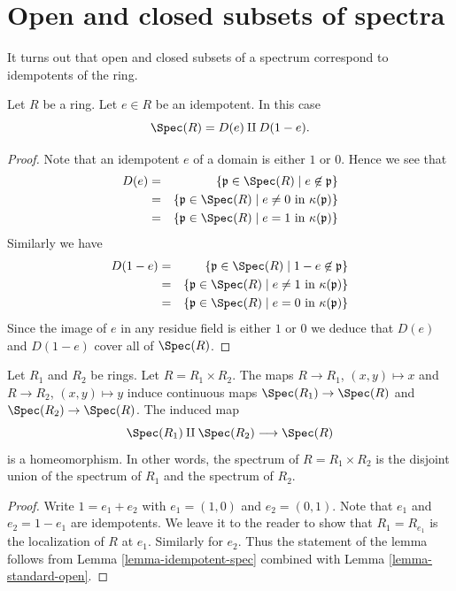 \section{Open and closed subsets of spectra}
\label{section-open-and-closed}

\noindent
It turns out that open and closed subsets of a spectrum correspond to
idempotents of the ring.

\begin{lemma}
\label{lemma-idempotent-spec}
Let $R$ be a ring. Let $e \in R$ be an idempotent.
In this case
$$
\Spec(R) = D(e) \amalg D(1-e).
$$
\end{lemma}

\begin{proof}
Note that an idempotent $e$ of a domain is either $1$ or $0$.
Hence we see that
\begin{eqnarray*}
D(e)
& = &
\{ \mathfrak p \in \Spec(R)
\mid
e \not\in \mathfrak p \} \\
& = &
\{ \mathfrak p \in \Spec(R)
\mid
e \not = 0\text{ in }\kappa(\mathfrak p) \} \\
& = &
\{ \mathfrak p \in \Spec(R)
\mid
e = 1\text{ in }\kappa(\mathfrak p) \}
\end{eqnarray*}
Similarly we have
\begin{eqnarray*}
D(1-e)
& = &
\{ \mathfrak p \in \Spec(R)
\mid
1 - e \not\in \mathfrak p \} \\
& = &
\{ \mathfrak p \in \Spec(R)
\mid
e \not = 1\text{ in }\kappa(\mathfrak p) \} \\
& = &
\{ \mathfrak p \in \Spec(R)
\mid
e = 0\text{ in }\kappa(\mathfrak p) \}
\end{eqnarray*}
Since the image of $e$ in any residue field is either $1$ or $0$
we deduce that $D(e)$ and $D(1-e)$ cover all of $\Spec(R)$.
\end{proof}

\begin{lemma}
\label{lemma-spec-product}
Let $R_1$ and $R_2$ be rings.
Let $R = R_1 \times R_2$.
The maps $R \to R_1$, $(x, y) \mapsto x$ and $R \to R_2$,
$(x, y) \mapsto y$
induce continuous maps $\Spec(R_1) \to \Spec(R)$ and
$\Spec(R_2) \to \Spec(R)$.
The induced map
$$
\Spec(R_1) \amalg \Spec(R_2)
\longrightarrow
\Spec(R)
$$
is a homeomorphism. In other words,
the spectrum of $R = R_1\times R_2$ is the
disjoint union of the spectrum of $R_1$ and the
spectrum of $R_2$.
\end{lemma}

\begin{proof}
Write $1 = e_1 + e_2$ with $e_1 = (1, 0)$ and $e_2 = (0, 1)$.
Note that $e_1$ and $e_2 = 1 - e_1$ are idempotents.
We leave it to the reader to show that
$R_1 = R_{e_1}$ is the localization of $R$ at $e_1$.
Similarly for $e_2$.
Thus the statement of the lemma follows from Lemma
\ref{lemma-idempotent-spec} combined with Lemma
\ref{lemma-standard-open}.
\end{proof}

